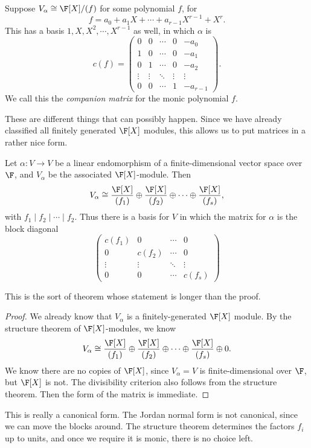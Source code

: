 \documentclass[a4paper]{article}
\begin{document}
\begin{eg}
  Suppose $V_\alpha \cong \F[X]/(f)$ for some polynomial $f$, for
  \[
    f = a_0 + a_1X + \cdots + a_{r - 1} X^{r - 1} + X^r.
  \]
  This has a basis $1, X, X^2, \cdots, X^{r - 1}$ as well, in which $\alpha$ is
  \[
    c(f) =
    \begin{pmatrix}
      0 & 0 & \cdots & 0 & -a_0\\
      1 & 0 & \cdots & 0 & -a_1\\
      0 & 1 & \cdots & 0 & -a_2\\
      \vdots & \vdots & \ddots & \vdots & \vdots\\
      0 & 0 & \cdots & 1 & -a_{r - 1}
    \end{pmatrix}.
  \]
  We call this the \emph{companion matrix} for the monic polynomial $f$.
\end{eg}
These are different things that can possibly happen. Since we have already classified all finitely generated $\F[X]$ modules, this allows us to put matrices in a rather nice form.

\begin{thm}
  Let $\alpha: V \to V$ be a linear endomorphism of a finite-dimensional vector space over $\F$, and $V_\alpha$ be the associated $\F[X]$-module. Then
  \[
    V_\alpha \cong \frac{\F[X]}{(f_1)} \oplus \frac{\F[X]}{(f_2)} \oplus \cdots \oplus \frac{\F[X]}{(f_s)},
  \]
  with $f_1 \mid f_2 \mid \cdots \mid f_2$. Thus there is a basis for $V$ in which the matrix for $\alpha$ is the block diagonal
  \[
    \begin{pmatrix}
      c(f_1) & 0 & \cdots & 0\\
      0 & c(f_2) & \cdots & 0\\
      \vdots & \vdots & \ddots & \vdots\\
      0 & 0 & \cdots & c(f_s)
    \end{pmatrix}
  \]
\end{thm}
This is the sort of theorem whose statement is longer than the proof.

\begin{proof}
  We already know that $V_\alpha$ is a finitely-generated $\F[X]$ module. By the structure theorem of $\F[X]$-modules, we know
  \[
    V_\alpha \cong \frac{\F[X]}{(f_1)} \oplus \frac{\F[X]}{(f_2)} \oplus \cdots \oplus \frac{\F[X]}{(f_s)} \oplus 0.
  \]
  We know there are no copies of $\F[X]$, since $V_\alpha = V$ is finite-dimensional over $\F$, but $\F[X]$ is not. The divisibility criterion also follows from the structure theorem. Then the form of the matrix is immediate.
\end{proof}
This is really a canonical form. The Jordan normal form is not canonical, since we can move the blocks around. The structure theorem determines the factors $f_i$ up to units, and once we require it is monic, there is no choice left.
\end{document}
